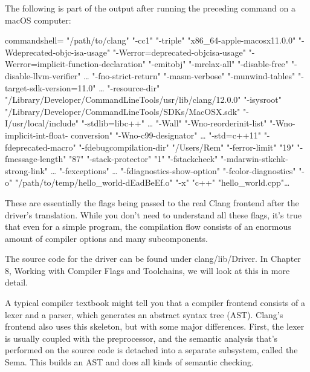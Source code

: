 
The following is part of the output after running the preceding command on a macOS computer:

\begin{tcblisting}{commandshell={}}
"/path/to/clang" "-cc1" "-triple" "x86_64-apple-macosx11.0.0"
"-Wdeprecated-objc-isa-usage" "-Werror=deprecated-objcisa-usage" 
"-Werror=implicit-function-declaration" "-emitobj" "-mrelax-all" 
"-disable-free" "-disable-llvm-verifier" … "-fno-strict-return" 
"-masm-verbose" "-munwind-tables" "-target-sdk-version=11.0" … "-resource-dir"
"/Library/Developer/CommandLineTools/usr/lib/clang/12.0.0" "-isysroot"
"/Library/Developer/CommandLineTools/SDKs/MacOSX.sdk" "-I/usr/local/include" 
"-stdlib=libc++" … "-Wall" "-Wno-reorderinit-list" "-Wno-implicit-int-float-
conversion" "-Wno-c99-designator" … "-std=c++11" "-fdeprecated-macro" 
"-fdebugcompilation-dir" "/Users/Rem" "-ferror-limit" "19" "-fmessage-length" 
"87" "-stack-protector" "1" "-fstackcheck" "-mdarwin-stkchk-strong-link" … 
"-fexceptions" … "-fdiagnostics-show-option" "-fcolor-diagnostics" "-o" 
"/path/to/temp/hello_world-dEadBeEf.o" "-x" "c++" "hello_world.cpp"…
\end{tcblisting}

These are essentially the flags being passed to the real Clang frontend after the driver's translation. While you don't need to understand all these flags, it's true that even for a simple program, the compilation flow consists of an enormous amount of compiler options and many subcomponents.

The source code for the driver can be found under clang/lib/Driver. In Chapter 8, Working with Compiler Flags and Toolchains, we will look at this in more detail.


A typical compiler textbook might tell you that a compiler frontend consists of a lexer and a parser, which generates an abstract syntax tree (AST). Clang's frontend also uses this skeleton, but with some major differences. First, the lexer is usually coupled with the preprocessor, and the semantic analysis that's performed on the source code is detached into a separate subsystem, called the Sema. This builds an AST and does all kinds of semantic checking.

